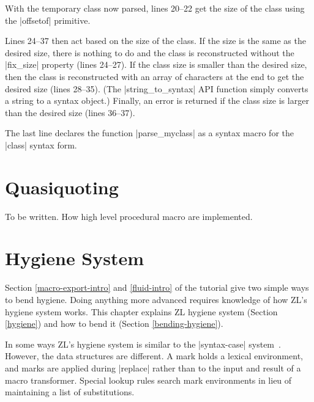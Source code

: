 With the temporary class now parsed, lines 20--22 get the size of the
class using the |offsetof| primitive.

Lines 24--37 then act based on the size of the class.  If the
size is the same as the desired size, there is nothing to do and the
class is reconstructed without the |fix_size| property (lines
24--27).  If the class size is smaller than the desired size, then the
class is reconstructed with an array of characters at the end to get
the desired size (lines 28--35).  (The |string_to_syntax| API function
simply converts a string to a syntax object.)  Finally, an error is
returned if the class size is larger than the desired size (lines
36--37).

The last line declares the function |parse_myclass| as a syntax macro
for the |class| syntax form.

\chapter{Quasiquoting}
 
To be written.  How high level procedural macro are implemented.


\chapter{Hygiene System}

Section \ref{macro-export-intro} and \ref{fluid-intro} of the tutorial
give two simple ways to bend hygiene.  Doing anything more advanced
requires knowledge of how ZL's hygiene system works.  This chapter
explains ZL hygiene system (Section \ref{hygiene}) and how to bend it
(Section \ref{bending-hygiene}).

In some ways ZL's hygiene system is similar to the |syntax-case|
system~\cite{syn-abst}.  However, the data structures are different. A
mark holds a lexical environment, and marks are applied during
|replace| rather than to the input and result of a macro
transformer. Special lookup rules search mark environments in lieu of
maintaining a list of substitutions.

